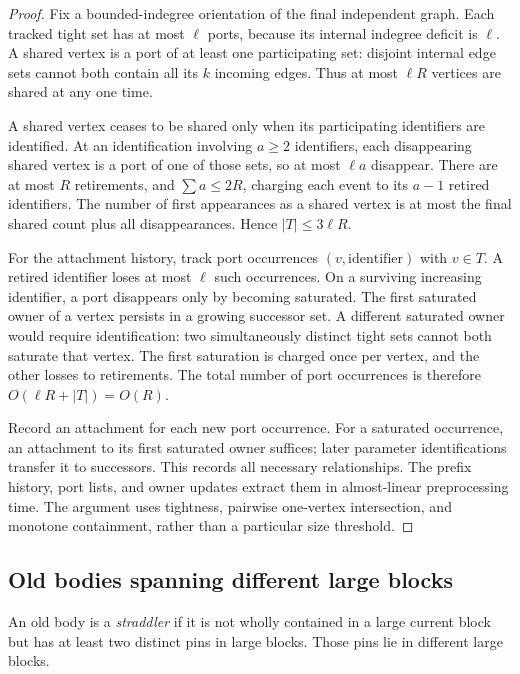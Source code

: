 \documentclass[11pt,a4paper]{article}
\theoremstyle{definition}
\theoremstyle{remark}
\begin{document}
\begin{proof}
Fix a bounded-indegree orientation of the final independent
graph. Each tracked tight set has at most $\ell$ ports,
because its internal indegree deficit is $\ell$.
A shared vertex is a port of at least one participating
set: disjoint internal edge sets cannot both contain
all its $k$ incoming edges.
Thus at most $\ell R$ vertices are shared at any one time.

A shared vertex ceases to be shared only when its
participating identifiers are identified. At an
identification involving $a\geq2$ identifiers, each
disappearing shared vertex is a port of one of those
sets, so at most $\ell a$ disappear.
There are at most $R$ retirements, and
$\sum a\leq2R$, charging each event to its $a-1$
retired identifiers. The number of first appearances
as a shared vertex is at most the final shared count
plus all disappearances. Hence $|T|\leq3\ell R$.

For the attachment history, track port occurrences
$(v,\text{identifier})$ with $v\in T$.
A retired identifier loses at most $\ell$ such occurrences.
On a surviving increasing identifier, a port disappears
only by becoming saturated. The first saturated owner
of a vertex persists in a growing successor set.
A different saturated owner would require identification:
two simultaneously distinct tight sets cannot both
saturate that vertex. The first saturation is charged
once per vertex, and the other losses to retirements.
The total number of port occurrences is therefore
$O(\ell R+|T|)=O(R)$.

Record an attachment for each new port occurrence.
For a saturated occurrence, an attachment to its first
saturated owner suffices; later parameter identifications
transfer it to successors. This records all necessary
relationships. The prefix history, port lists, and owner
updates extract them in almost-linear preprocessing time.
The argument uses tightness, pairwise one-vertex
intersection, and monotone containment, rather than a
particular size threshold.
\end{proof}

\subsection{Old bodies spanning different large blocks}

An old body is a \emph{straddler} if it is not wholly
contained in a large current block but has at least two
distinct pins in large blocks. Those pins lie in different
large blocks.
\end{document}
